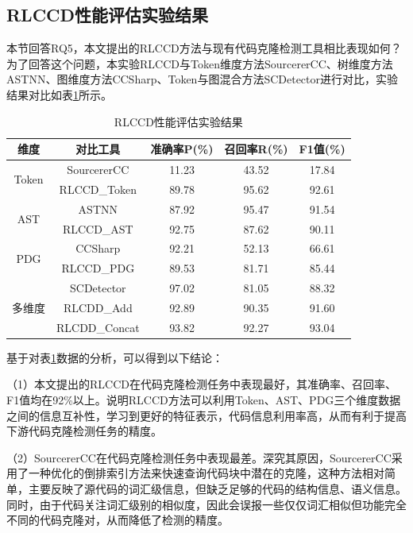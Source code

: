 \subsection{RLCCD性能评估实验结果}

本节回答RQ5，本文提出的RLCCD方法与现有代码克隆检测工具相比表现如何？为了回答这个问题，本实验RLCCD与Token维度方法SourcererCC、树维度方法ASTNN、图维度方法CCSharp、Token与图混合方法SCDetector进行对比，实验结果对比如表\ref{tab:RLCCD}所示。

\begin{table}[htp]
  \centering
  \caption{RLCCD性能评估实验结果}
  \label{tab:RLCCD}
  \begin{tabular*}{0.9\textwidth}{@{\extracolsep{\fill}}ccccc}
  \toprule
    维度 &对比工具		& 准确率P(\%) & 召回率R(\%) & F1值(\%)  \\ 
  \midrule
  \multirow{2}{*}{Token} & SourcererCC		& 11.23	  & 43.52		& 17.84 \\
  & RLCCD\_Token    & 89.78	  & 95.62	  & 92.61	   \\ 
  \cmidrule{2-5} 
  \multirow{2}{*}{AST}   & ASTNN	        & 87.92		& 95.47		& 91.54 \\
  & RLCCD\_AST      & 92.75	  & 87.62	  & 90.11   \\ 
  \cmidrule{2-5} 
  \multirow{2}{*}{PDG}   & CCSharp			  & 92.21	  & 52.13	  & 66.61 \\
  & RLCCD\_PDG		  & 89.53		& 81.71		& 85.44   \\
  \cmidrule{2-5} 
  \multirow{3}{*}{多维度} & SCDetector		 & 97.02	 & 81.05	 & 88.32 \\
  & RLCDD\_Add			& 92.89		& 90.35		& 91.60   \\
  & RLCDD\_Concat		& 93.82		& 92.27		& 93.04  \\
  \bottomrule
  \end{tabular*}
\end{table}


基于对表\ref{tab:RLCCD}数据的分析，可以得到以下结论：

（1）本文提出的RLCCD在代码克隆检测任务中表现最好，其准确率、召回率、F1值均在92\%以上。说明RLCCD方法可以利用Token、AST、PDG三个维度数据之间的信息互补性，学习到更好的特征表示，代码信息利用率高，从而有利于提高下游代码克隆检测任务的精度。

（2）SourcererCC在代码克隆检测任务中表现最差。深究其原因，SourcererCC采用了一种优化的倒排索引方法来快速查询代码块中潜在的克隆，这种方法相对简单，主要反映了源代码的词汇级信息，但缺乏足够的代码的结构信息、语义信息。同时，由于代码关注词汇级别的相似度，因此会误报一些仅仅词汇相似但功能完全不同的代码克隆对，从而降低了检测的精度。

